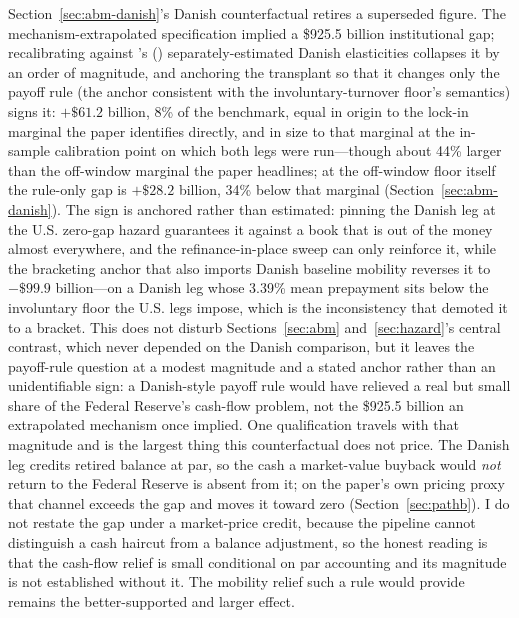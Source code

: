 \documentclass[12pt]{article}
\newcommand{\citepos}[1]{\citeauthor{#1}'s (\citeyear{#1})}
\begin{document}
Section~\ref{sec:abm-danish}'s Danish counterfactual retires a superseded figure. The mechanism-extrapolated specification implied a \$925.5 billion institutional gap; recalibrating against \citepos{berger2026} separately-estimated Danish elasticities collapses it by an order of magnitude, and anchoring the transplant so that it changes only the payoff rule (the anchor consistent with the involuntary-turnover floor's semantics) signs it: $+\$61.2$ billion, 8\% of the benchmark, equal in origin to the lock-in marginal the paper identifies directly, and in size to that marginal at the in-sample calibration point on which both legs were run---though about 44\% larger than the off-window marginal the paper headlines; at the off-window floor itself the rule-only gap is $+\$28.2$ billion, 34\% below that marginal (Section~\ref{sec:abm-danish}). The sign is anchored rather than estimated: pinning the Danish leg at the U.S. zero-gap hazard guarantees it against a book that is out of the money almost everywhere, and the refinance-in-place sweep can only reinforce it, while the bracketing anchor that also imports Danish baseline mobility reverses it to $-\$99.9$ billion---on a Danish leg whose 3.39\% mean prepayment sits below the involuntary floor the U.S. legs impose, which is the inconsistency that demoted it to a bracket. This does not disturb Sections~\ref{sec:abm} and~\ref{sec:hazard}'s central contrast, which never depended on the Danish comparison, but it leaves the payoff-rule question at a modest magnitude and a stated anchor rather than an unidentifiable sign: a Danish-style payoff rule would have relieved a real but small share of the Federal Reserve's cash-flow problem, not the \$925.5 billion an extrapolated mechanism once implied. One qualification travels with that magnitude and is the largest thing this counterfactual does not price. The Danish leg credits retired balance at par, so the cash a market-value buyback would \emph{not} return to the Federal Reserve is absent from it; on the paper's own pricing proxy that channel exceeds the gap and moves it toward zero (Section~\ref{sec:pathb}). I do not restate the gap under a market-price credit, because the pipeline cannot distinguish a cash haircut from a balance adjustment, so the honest reading is that the cash-flow relief is small conditional on par accounting and its magnitude is not established without it. The mobility relief such a rule would provide remains the better-supported and larger effect.
\end{document}
